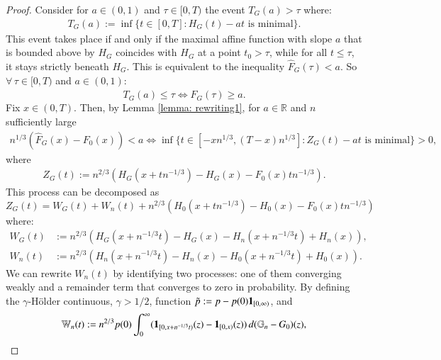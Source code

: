 \begin{proof}
Consider for $a \in (0,1)$ and $\tau \in [0,T)$ the event $T_{\scriptscriptstyle{G}}(a) > \tau$ where:
\begin{align}\label{def: T_G}
T_{\scriptscriptstyle{G}}(a) := \inf \{ t \in [0,T] : H_{\scriptscriptstyle{G}}(t) - a t \, \, \text{is minimal} \}.
\end{align}
This event takes place if and only if the maximal affine function with slope $a$ that is bounded above by $H_{\scriptscriptstyle{G}}$ coincides with $H_{\scriptscriptstyle{G}}$ at a point $t_0 > \tau$, while for all $t \le \tau$, it stays strictly beneath $H_{\scriptscriptstyle{G}}$. This is equivalent to the inequality $\hat{F}_{\scriptscriptstyle{G}}(\tau) < a$. So $\forall \, \tau \in [0,T)$ and $a \in (0,1):$
\[
T_{\scriptscriptstyle{G}}(a) \le \tau \iff \hat{F}_{\scriptscriptstyle{G}}(\tau) \ge a.
\]
Fix $x \in (0,T)$. Then, by Lemma \ref{lemma: rewriting1}, for $a \in \mathbb{R}$ and $n$ sufficiently large
\begin{align*}
n^{1/3} (\hat{F}_{\scriptscriptstyle{G}}(x) - F_0(x)) < a \iff \inf \{ t \in [-x n^{1/3}, (T-x) n^{1/3}] : Z_{\scriptscriptstyle{G}}(t) - a t \, \, \text{is minimal} \} > 0,
\end{align*}
where
\begin{align}\label{def: Z_G}
Z_{\scriptscriptstyle{G}}(t) := n^{2/3} \left( H_{\scriptscriptstyle{G}}(x + t n^{-1/3}) - H_{\scriptscriptstyle{G}}(x) - F_0(x) t n^{-1/3} \right).
\end{align}
This process can be decomposed as
\[
Z_{\scriptscriptstyle{G}}(t) = W_{\scriptscriptstyle{G}}(t) + W_n(t) + n^{2/3} (H_0(x + t n^{-1/3}) - H_0(x) - F_0(x) t n^{-1/3})
\]
where:
\begin{align*}
W_{\scriptscriptstyle{G}}(t) &:= n^{2/3} (H_{\scriptscriptstyle{G}}(x + n^{-1/3}t) - H_{\scriptscriptstyle{G}}(x) - H_n(x + n^{-1/3}t) + H_n(x)), \\
W_n(t) &:= n^{2/3} (H_{n}(x + n^{-1/3}t) - H_{n}(x) - H_0(x + n^{-1/3}t) + H_0(x)).
\end{align*}
We can rewrite $W_n(t)$ by identifying two processes: one of them converging weakly and a remainder term that converges to zero in probability. By defining the $\gamma$-H\"{o}lder continuous, $\gamma > 1/2$, function $\tilde{p} := p - p(0) \mathbf{1}_{[0,\infty)}$, and 
\begin{align*}
\mathbb{W}_n(t) &:= n^{2/3} p(0) \int_0^\infty (\ind_{[0, x + n^{-1/3}t)}(z) - \ind_{[0, x)}(z)) \, d(\mathbb{G}_n - G_0)(z), \\

\end{align*}
\end{proof}
